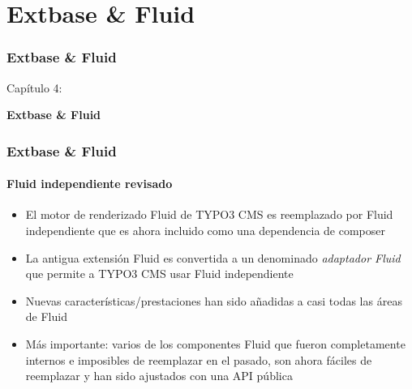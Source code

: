 %

\section{Extbase \& Fluid}
\begin{frame}[fragile]
	\frametitle{Extbase \& Fluid}

	\begin{center}\huge{Capítulo 4:}\end{center}
	\begin{center}\huge{\color{typo3darkgrey}\textbf{Extbase \& Fluid}}\end{center}

\end{frame}


\begin{frame}[fragile]
	\frametitle{Extbase \& Fluid}
	\framesubtitle{Fluid independiente revisado}

	\lstset{basicstyle=\tiny\ttfamily}

	\begin{itemize}

		\item El motor de renderizado Fluid de TYPO3 CMS es reemplazado por Fluid independiente
			que es ahora incluido como una dependencia de composer

		\item La antigua extensión Fluid es convertida a un denominado \textit{adaptador Fluid}
			que permite a TYPO3 CMS usar Fluid independiente

		\item Nuevas características/prestaciones han sido añadidas a casi todas las áreas de Fluid

		\item Más importante: varios de los componentes Fluid que fueron completamente
			internos e imposibles de reemplazar en el pasado, son ahora fáciles de
			reemplazar y han sido ajustados con una API pública

	\end{itemize}

\end{frame}

